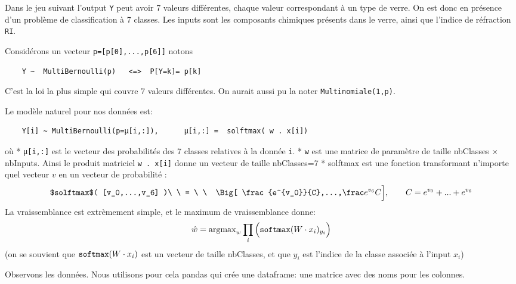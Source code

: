 \documentclass[11pt]{article}
\begin{document}
Dans le jeu suivant l'output \texttt{Y} peut avoir 7 valeurs
différentes, chaque valeur correspondant à un type de verre. On est donc
en présence d'un problème de classification à 7 classes. Les inputs sont
les composants chimiques présents dans le verre, ainsi que l'indice de
réfraction \texttt{RI}.

Considérons un vecteur \texttt{p={[}p{[}0{]},...,p{[}6{]}{]}} notons

\begin{verbatim}
    Y ~  MultiBernoulli(p)   <=>  P[Y=k]= p[k]
\end{verbatim}

C'est la loi la plus simple qui couvre 7 valeurs différentes. On aurait
aussi pu la noter \texttt{Multinomiale(1,p)}.

Le modèle naturel pour nos données est:

\begin{verbatim}
    Y[i] ~ MultiBernoulli(p=μ[i,:]),      μ[i,:] =  solftmax( w . x[i])     
\end{verbatim}

où * \texttt{μ{[}i,:{]}} est le vecteur des probabilités des 7 classes
relatives à la donnée \texttt{i}. * \texttt{w} est une matrice de
paramètre de taille nbClasses × nbInputs. Ainsi le produit matriciel
\texttt{w\ .\ x{[}i{]}} donne un vecteur de taille nbClasses=7 *
solftmax est une fonction transformant n'importe quel vecteur \(v\) en
un vecteur de probabilité : \[
        \verb $solftmax$( [v_0,...,v_6] )\ \ = \ \  \Big[ \frac {e^{v_0}}{C},...,\frac {e^{v_6}}{C}    \Big] ,  \qquad 
        C=  {e^{v_0}} + ... +  {e^{v_6}}
\] La vraissemblance est extrèmement simple, et le maximum de
vraissemblance donne: \[
\hat w  = \hbox{argmax}_w  \prod_i    \Big (  \verb IsoftmaxI (W\cdot x_i)  _{y_i}    \Big)
\] (on se souvient que \(\verb IsoftmaxI (W\cdot x_i)\) est un vecteur
de taille nbClasses, et que \(y_i\) est l'indice de la classe associée à
l'input \(x_i\))

    Observons les données. Nous utilisons pour cela pandas qui crée une
dataframe: une matrice avec des noms pour les colonnes.
\end{document}
